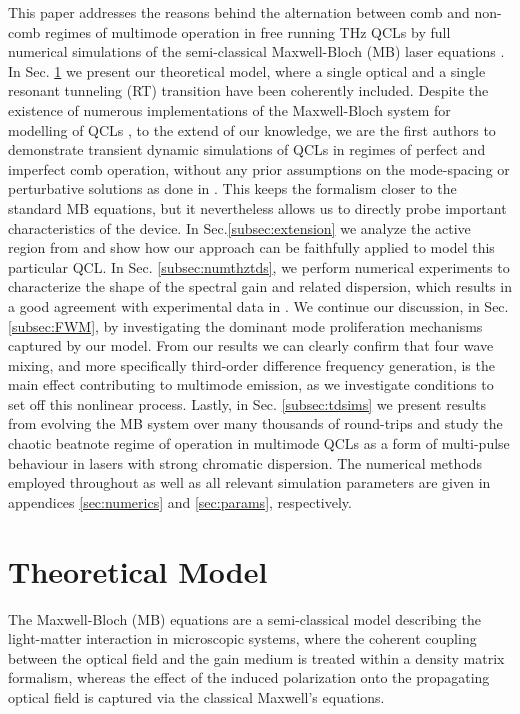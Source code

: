 \documentclass[10pt,letterpaper]{article}
\begin{document}
This paper addresses the reasons behind the alternation between comb and non-comb regimes of multimode operation in free running THz QCLs by full numerical simulations of the semi-classical Maxwell-Bloch (MB) laser equations \cite{boyd2003nonlinear}. In Sec. \ref{sec:thmodel} we present our theoretical model, where a single optical and a single resonant tunneling (RT) transition have been coherently included. Despite the existence of numerous implementations of the Maxwell-Bloch system for modelling of QCLs \cite{villares2015quantum,gordon2008multimode,wang2015active,talukder2010self}, to the extend of our knowledge, we are the first authors to demonstrate transient dynamic simulations of QCLs in regimes of perfect and imperfect comb operation, without any prior assumptions on the mode-spacing or perturbative solutions as done in \cite{khurgin2014coherent,villares2015quantum}. This keeps the formalism closer to the standard MB equations, but it nevertheless allows us to directly probe important characteristics of the device. In Sec.\ref{subsec:extension} we analyze the active region from \cite{burghoff2014terahertz} and show how our approach can be faithfully applied to model this particular QCL. In Sec. \ref{subsec:numthztds}, we perform  numerical experiments to characterize the shape of the spectral gain and related dispersion, which results in a good agreement with experimental data in \cite{burghoff2014broadband}. We continue our discussion, in Sec. \ref{subsec:FWM}, by investigating the dominant mode proliferation mechanisms captured by our model. From our results we can clearly confirm that four wave mixing, and more specifically third-order difference frequency generation, is the main effect contributing to multimode emission, as we investigate conditions to set off this nonlinear process. Lastly, in Sec. \ref{subsec:tdsims} we present results from evolving the MB system over many thousands of round-trips and study the chaotic beatnote regime of operation in multimode QCLs as a form of multi-pulse behaviour in lasers with strong chromatic dispersion. The numerical methods employed throughout as well as all relevant simulation parameters are given in appendices \ref{sec:numerics} and \ref{sec:params}, respectively. 

\section{Theoretical Model}
\label{sec:thmodel}

The Maxwell-Bloch (MB) equations are a semi-classical model describing the light-matter interaction in microscopic systems, where the coherent coupling between the optical field and the gain medium is treated within a density matrix formalism, whereas the effect of the induced polarization onto the propagating optical field is captured via the classical Maxwell's equations.
\end{document}
